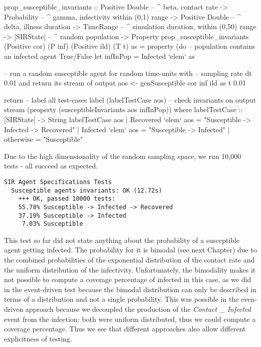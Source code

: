 \begin{HaskellCode}
prop_susceptible_invariants :: Positive Double  -- ^ beta, contact rate
                            -> Probability      -- ^ gamma, infectivity within (0,1) range
                            -> Positive Double  -- ^ delta, illness duration
                            -> TimeRange        -- ^ simulation duration, within (0,50) range
                            -> [SIRState]       -- ^ random population
                            -> Property
prop_susceptible_invariants
      (Positive cor) (P inf) (Positive ild) (T t) as = property (do  
    -- population contains an infected agent True/False
    let infInPop = Infected `elem` as

    -- run a random susceptible agent for random time-units with 
    -- sampling rate dt 0.01 and return its stream of output
    aos <- genSusceptible cor inf ild as t 0.01

    return 
        -- label all test-cases
        label (labelTestCase aos) 
        -- check invariants on output stream
        (property (susceptibleInvariants aos infInPop))
  where
    labelTestCase :: [SIRState] -> String
    labelTestCase aos
      | Recovered `elem` aos = "Susceptible -> Infected -> Recovered"
      | Infected `elem` aos  = "Susceptible -> Infected"
      | otherwise            = "Susceptible"
\end{HaskellCode}

Due to the high dimensionality of the random sampling space, we run 10,000 tests - all succeed as expected.

\begin{verbatim}
SIR Agent Specifications Tests
  Susceptible agents invariants: OK (12.72s)
    +++ OK, passed 10000 tests:
    55.78% Susceptible -> Infected -> Recovered
    37.19% Susceptible -> Infected
     7.03% Susceptible
\end{verbatim}

This test so far did not state anything about the probability of a susceptible agent getting infected. The probability for it is bimodal (see next Chapter) due to the combined probabilities of the exponential distribution of the contact rate and the uniform distribution of the infectivity. Unfortunately, the bimodality makes it not possible to compute a coverage percentage of infected in this case, as we did in the event-driven test because the bimodal distribution can only be described in terms of a distribution and not a single probability. This was possible in the even-driven approach because we decoupled the production of the \textit{Contact \_ Infected} event from the infection: both were uniform distributed, thus we could compute a coverage percentage. Thus we see that different approaches also allow different explicitness of testing.

